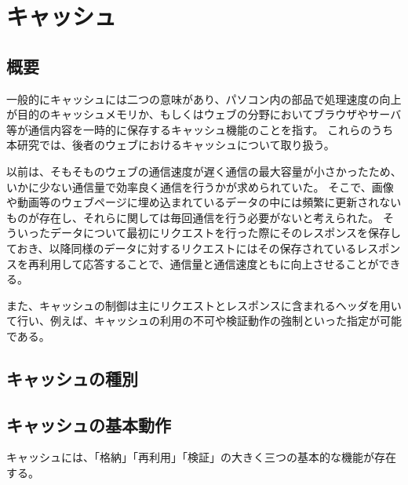 \documentclass[12pt,a4paper]{jbook}
\begin{document}
\section{キャッシュ}
\label{sec:cache}
\subsection{概要}
一般的にキャッシュには二つの意味があり、パソコン内の部品で処理速度の向上が目的のキャッシュメモリか、もしくはウェブの分野においてブラウザやサーバ等が通信内容を一時的に保存するキャッシュ機能のことを指す。
これらのうち本研究では、後者のウェブにおけるキャッシュについて取り扱う。

以前は、そもそものウェブの通信速度が遅く通信の最大容量が小さかったため、いかに少ない通信量で効率良く通信を行うかが求められていた。
そこで、画像や動画等のウェブページに埋め込まれているデータの中には頻繁に更新されないものが存在し、それらに関しては毎回通信を行う必要がないと考えられた。
そういったデータについて最初にリクエストを行った際にそのレスポンスを保存しておき、以降同様のデータに対するリクエストにはその保存されているレスポンスを再利用して応答することで、通信量と通信速度ともに向上させることができる。

また、キャッシュの制御は主にリクエストとレスポンスに含まれるヘッダを用いて行い、例えば、キャッシュの利用の不可や検証動作の強制といった指定が可能である。

\subsection{キャッシュの種別}

\subsection{キャッシュの基本動作}
キャッシュには、「格納」「再利用」「検証」の大きく三つの基本的な機能が存在する。
\end{document}
